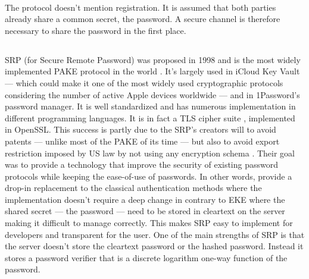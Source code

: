 ﻿\documentclass[../report.tex]{subfiles}
\begin{document}
\paragraph{}
The protocol doesn't mention registration. It is assumed that both parties already share a common secret, the password. A secure channel is therefore necessary to share the password in the first place.


\subsection{}
\paragraph{}
SRP \cite{SRP_Paper, SRP_6_Paper} (for Secure Remote Password) was proposed in 1998 and is the most widely implemented PAKE protocol in the world \cite{PAKE_Green_blog}.
It's largely used in iCloud Key Vault --- which could make it one of the most widely used cryptographic protocols \cite{PAKE_Green_blog} considering the number of active Apple devices worldwide --- and in 1Password's password manager.
It is well standardized and has numerous implementation in different programming languages. %
It is in fact a TLS cipher suite \cite{SRP_RFC_3}, implemented in OpenSSL.
This success is partly due to the SRP's creators will to avoid patents --- unlike most of the PAKE of its time --- but also to avoid export restriction imposed by US law by not using any encryption schema \cite{SRP_Formal_Analysis}.
Their goal was to provide a technology that improve the security of existing password protocols while keeping the ease-of-use of passwords. In other words, provide a drop-in replacement to the classical authentication methods where the implementation doesn't require a deep change in contrary to EKE where the shared secret --- the password --- need to be stored in cleartext on the server making it difficult to manage correctly.
This makes SRP easy to implement for developers and transparent for the user.
One of the main strengths of SRP is that the server doesn't store the cleartext password or the hashed password. Instead it stores a password verifier that is a discrete logarithm one-way function of the password.
\end{document}

